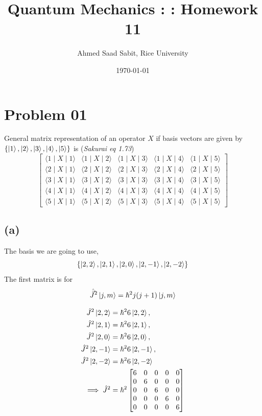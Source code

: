 \documentclass[letter, 10pts]{article}
\title{Quantum Mechanics : : Homework 11}
\author{Ahmed Saad Sabit, Rice University}
\date{\today}
\newcommand{\hb}{\hbar}
\begin{document}
\maketitle



\section*{Problem 01} 
General matrix representation of an operator $X$ if basis vectors are given by 
$\{ \ket{1}, \ket{2}, \ket{3}, \ket{4}, \ket{5} \}$ is (\emph{Sakurai eq 1.73})
\[
\begin{bmatrix}
\langle 1 \mid X \mid 1 \rangle & \langle 1 \mid X \mid 2 \rangle & \langle 1 \mid X \mid 3 \rangle & \langle 1 \mid X \mid 4 \rangle & \langle 1 \mid X \mid 5 \rangle \\
\langle 2 \mid X \mid 1 \rangle & \langle 2 \mid X \mid 2 \rangle & \langle 2 \mid X \mid 3 \rangle & \langle 2 \mid X \mid 4 \rangle & \langle 2 \mid X \mid 5 \rangle \\
\langle 3 \mid X \mid 1 \rangle & \langle 3 \mid X \mid 2 \rangle & \langle 3 \mid X \mid 3 \rangle & \langle 3 \mid X \mid 4 \rangle & \langle 3 \mid X \mid 5 \rangle \\
\langle 4 \mid X \mid 1 \rangle & \langle 4 \mid X \mid 2 \rangle & \langle 4 \mid X \mid 3 \rangle & \langle 4 \mid X \mid 4 \rangle & \langle 4 \mid X \mid 5 \rangle \\
\langle 5 \mid X \mid 1 \rangle & \langle 5 \mid X \mid 2 \rangle & \langle 5 \mid X \mid 3 \rangle & \langle 5 \mid X \mid 4 \rangle & \langle 5 \mid X \mid 5 \rangle
\end{bmatrix}
\]





\subsection*{(a)} 
The basis we are going to use, 
\[
\{
	\ket{2,2}, 
	\ket{2,1}, 
	\ket{2,0},
	\ket{2,-1},
\ket{2,-2} \}
\] 
The first matrix is for 
\[
\hat{\vec{J}}^2 \ket{j,m} = \hb^2 j (j+1) \ket{j,m}
\] 

\begin{align*}
\hat{J}^2 \ket{2,2} &= \hbar^2 6 \ket{2,2}, \\
\hat{J}^2 \ket{2,1} &= \hbar^2 6 \ket{2,1}, \\
\hat{J}^2 \ket{2,0} &= \hbar^2 6 \ket{2,0}, \\
\hat{J}^2 \ket{2,-1} &= \hbar^2 6 \ket{2,-1}, \\
\hat{J}^2 \ket{2,-2} &= \hbar^2 6 \ket{2,-2}
\\ \implies
\hat{J}^2 &=		     
\hb^2 
\begin{bmatrix}
6 & 0 & 0 & 0 & 0 \\
0 & 6 & 0 & 0 & 0 \\
0 & 0 & 6 & 0 & 0 \\
0 & 0 & 0 & 6 & 0 \\
0 & 0 & 0 & 0 & 6
\end{bmatrix}
\end{align*}
\end{document}
